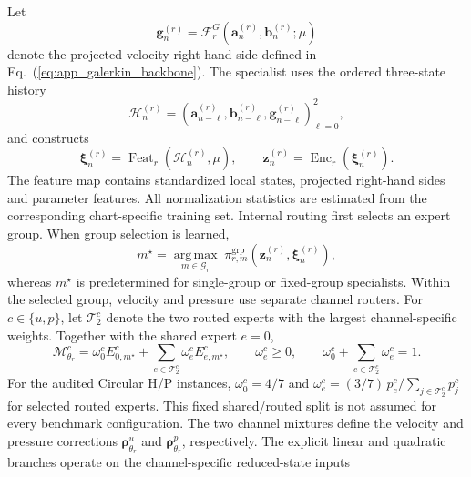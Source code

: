 \documentclass{article}
\def\plaineqref#1{\ref{#1}}
\begin{document}
Let
\begin{equation}
  \bm g_n^{(r)}
  =
  \mathcal F_r^G
  \left(
    \bm a_n^{(r)},\bm b_n^{(r)};\mu
  \right)
  \label{eq:app_galerkin_feature}
\end{equation}
denote the projected velocity right-hand side defined in Eq.~(\plaineqref{eq:app_galerkin_backbone}). The specialist uses the ordered three-state history
\begin{equation}
  \mathcal H_n^{(r)}
  =
  \left(
    \bm a_{n-\ell}^{(r)},
    \bm b_{n-\ell}^{(r)},
    \bm g_{n-\ell}^{(r)}
  \right)_{\ell=0}^{2},
  \label{eq:app_specialist_history}
\end{equation}
and constructs
\begin{equation}
  \bm\xi_n^{(r)}
  =
  \operatorname{Feat}_r
  \left(
    \mathcal H_n^{(r)},\mu
  \right),
  \qquad
  \bm z_n^{(r)}
  =
  \operatorname{Enc}_r
  \left(
    \bm\xi_n^{(r)}
  \right).
  \label{eq:app_specialist_features}
\end{equation}
The feature map contains standardized local states, projected
right-hand sides and parameter features. All normalization statistics are estimated from the corresponding chart-specific training set. Internal routing first selects an expert group. When group selection is learned,
\begin{equation}
  m^\star
  =
  \underset{m\in\mathcal G_r}{\operatorname{arg\,max}}
  \;
  \pi_{r,m}^{\mathrm{grp}}
  \left(
    \bm z_n^{(r)},\bm\xi_n^{(r)}
  \right),
  \label{eq:app_group_top1}
\end{equation}
whereas $m^\star$ is predetermined for single-group or fixed-group
specialists. Within the selected group, velocity and pressure use separate channel routers. For $c\in\{u,p\}$, let $\mathcal T_2^c$ denote the two routed experts with the largest channel-specific weights. Together with the shared expert $e=0$,
\begin{equation}
  \mathcal M_{\theta_r}^c
  =
  \omega_0^c
  E_{0,m^\star}^c
  +
  \sum_{e\in\mathcal T_2^c}
  \omega_e^c
  E_{e,m^\star}^c,
  \qquad
  \omega_e^c\ge0,
  \qquad
  \omega_0^c+\sum_{e\in\mathcal T_2^c}\omega_e^c=1.
  \label{eq:app_channel_sparse_moe}
\end{equation}
For the audited Circular H/P instances, $\omega_0^c=4/7$ and
$\omega_e^c=(3/7)\,p_e^c/\sum_{j\in\mathcal T_2^c}p_j^c$ for selected
routed experts. This fixed shared/routed split is not assumed for every
benchmark configuration.
The two channel mixtures define the velocity and pressure corrections
$\bm\rho_{\theta_r}^u$ and $\bm\rho_{\theta_r}^p$, respectively. The explicit linear and quadratic branches operate on the channel-specific reduced-state inputs
\end{document}

